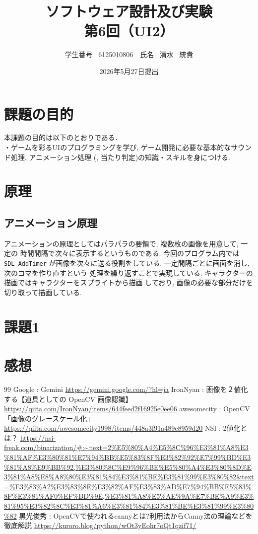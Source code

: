 \documentclass[dvipdfmx]{jsarticle}
\title{ソフトウェア設計及び実験\\第6回（UI2）}
\author{学生番号 \ 6125010806　氏名 \ 清水 \ 統貴}
\date{2026年5月27日提出}
\begin{document}
\maketitle

\section{課題の目的}
%
本課題の目的は以下のとおりである．\\
・ゲームを彩るUIのプログラミングを学び, ゲーム開発に必要な基本的なサウンド処理, 
アニメーション処理 (, 当たり判定)の知識・スキルを身につける.\\

\section{原理}
%
\subsection{アニメーション原理}
%
アニメーションの原理としてはパラパラの要領で, 複数枚の画像を用意して, 一定の
時間間隔で次々に表示するというものである. 今回のプログラム内では\verb+SDL_AddTimer+
が画像を次々に送る役割をしている. 一定間隔ごとに画面を消し, 次のコマを作り直すという
処理を繰り返すことで実現している. キャラクターの描画ではキャラクターをスプライトから描画
しており, 画像の必要な部分だけを切り取って描画している. 
\section{課題1}
%

\section{感想}
%


\begin{thebibliography}{99}
%
 Google : Gemini \url{https://gemini.google.com/?hl=ja}
%
 IronNyan : 画像を２値化する【道具としての OpenCV 画像認識】 \url{https://qiita.com/IronNyan/items/644feed2f16925e0ee06}
%
 awesomecity : OpenCV　「画像のグレースケール化」 \url{https://qiita.com/awesomecity1998/items/448a3f91a489c8959d20}
%
 NSI : 2値化とは？ \url{https://nsi-freak.com/binarization/#:~:text=2%E5%80%A4%E5%8C%96%E3%81%A8%E3%81%AF%E3%80%81%E7%94%BB%E5%83%8F%E3%82%92%E7%99%BD%E3%81%A8%E9%BB%92,%E3%80%8C%E9%96%BE%E5%80%A4%E3%80%8D%E3%81%A8%E8%A8%80%E3%81%84%E3%81%BE%E3%81%99%E3%80%82&text=%E3%83%A2%E3%83%8E%E3%82%AF%E3%83%AD%E7%94%BB%E5%83%8F%E3%81%AF0%EF%BD%9E,%E3%81%A8%E5%AE%9A%E7%BE%A9%E3%81%95%E3%82%8C%E3%81%A6%E3%81%84%E3%81%BE%E3%81%99%E3%80%82}
%
 黒光俊秀 : OpenCVで使われるcannyとは?利用法からCanny法の理論などを徹底解説 \url{https://kuroro.blog/python/wOt3yEohr7oQt1qzif71/}
%
\end{thebibliography}
\end{document}
